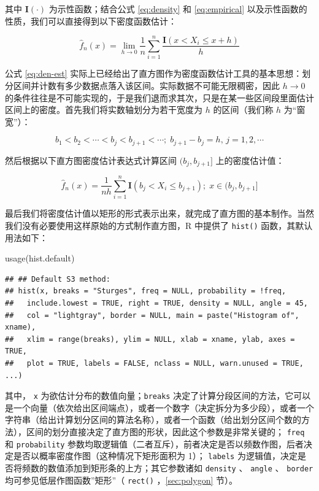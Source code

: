 \documentclass[
  b5paper,
  UTF8,twoside]{book}
\newenvironment{Shaded}{\begin{snugshade}}{\end{snugshade}}
\newcommand{\FunctionTok}[1]{\textcolor[rgb]{0.00,0.00,0.00}{#1}}
\newcommand{\NormalTok}[1]{#1}
\begin{document}
其中 \(\mathbf{I}(\cdot)\) 为示性函数；结合公式 \eqref{eq:density} 和 \eqref{eq:empirical} 以及示性函数的性质，我们可以直接得到以下密度函数估计：

\begin{equation} 
\hat{f}_{n}(x)=\lim_{h\rightarrow0}\frac{1}{n}\sum_{i=1}^{n}\frac{\mathbf{I}(x<X_{i}\leq x+h)}{h}
\label{eq:den-est}
\end{equation}

公式 \eqref{eq:den-est} 实际上已经给出了直方图作为密度函数估计工具的基本思想：划分区间并计数有多少数据点落入该区间。实际数据不可能无限稠密，因此 \(h\rightarrow0\) 的条件往往是不可能实现的，于是我们退而求其次，只是在某一些区间段里面估计区间上的密度。首先我们将实数轴划分为若干宽度为 \(h\) 的区间（我们称 \(h\) 为``窗宽''）：

\begin{equation} 
b_{1}<b_{2}<\cdots<b_{j}<b_{j+1}<\cdots;\;b_{j+1}-b_{j}=h,\,j=1,2,\cdots
\label{eq:den-est2}
\end{equation}

然后根据以下直方图密度估计表达式计算区间 \((b_j,b_{j+1}]\) 上的密度估计值：

\begin{equation} 
\hat{f}_{n}(x)=\frac{1}{nh}\sum_{i=1}^{n}\mathbf{I}(b_{j}<X_{i}\leq b_{j+1});\;x\in(b_{j},b_{j+1}]
\label{eq:den-formula}
\end{equation}

最后我们将密度估计值以矩形的形式表示出来，就完成了直方图的基本制作。当然我们没有必要使用这样原始的方式制作直方图，R 中提供了 \texttt{hist()} 函数，其默认用法如下：

\begin{Shaded}
\begin{Highlighting}[]
\FunctionTok{usage}\NormalTok{(hist.default)}
\end{Highlighting}
\end{Shaded}

\begin{verbatim}
## ## Default S3 method:
## hist(x, breaks = "Sturges", freq = NULL, probability = !freq,
##   include.lowest = TRUE, right = TRUE, density = NULL, angle = 45,
##   col = "lightgray", border = NULL, main = paste("Histogram of", xname),
##   xlim = range(breaks), ylim = NULL, xlab = xname, ylab, axes = TRUE,
##   plot = TRUE, labels = FALSE, nclass = NULL, warn.unused = TRUE, ...)
\end{verbatim}

其中， \texttt{x} 为欲估计分布的数值向量；\texttt{breaks} 决定了计算分段区间的方法，它可以是一个向量（依次给出区间端点），或者一个数字（决定拆分为多少段），或者一个字符串（给出计算划分区间的算法名称），或者一个函数（给出划分区间个数的方法），区间的划分直接决定了直方图的形状，因此这个参数是非常关键的； \texttt{freq} 和 \texttt{probability} 参数均取逻辑值（二者互斥），前者决定是否以频数作图，后者决定是否以概率密度作图（这种情况下矩形面积为 1）； \texttt{labels} 为逻辑值，决定是否将频数的数值添加到矩形条的上方；其它参数诸如 \texttt{density} 、 \texttt{angle} 、 \texttt{border} 均可参见低层作图函数''矩形''（ \texttt{rect()} ，\ref{sec:polygon} 节）。
\end{document}
